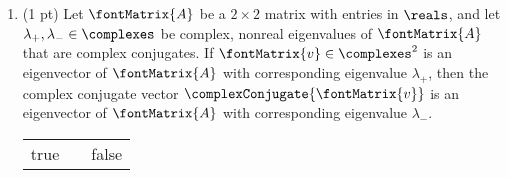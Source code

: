 %
%
%
%



\begin{enumerate}[resume,label=(\alph*)]
\item\label{itm : E4Q1e} (1 pt) Let $\fontMatrix{A}$ be a $2 \times 2$ matrix with entries in $\reals$, and let $\lambda_{+},\lambda_{-} \in \complexes$ be complex, nonreal eigenvalues of $\fontMatrix{A}$ that are complex conjugates. If $\fontMatrix{v} \in \complexes^{2}$ is an eigenvector of $\fontMatrix{A}$ with corresponding eigenvalue $\lambda_{+}$, then the complex conjugate vector $\complexConjugate{\fontMatrix{v}}$ is an eigenvector of $\fontMatrix{A}$ with corresponding eigenvalue $\lambda_{-}$.
\begin{center}
\begin{tabular}{c c c}
true	&	\hspace{1in}	&	false
\end{tabular}
\end{center}
\end{enumerate}




